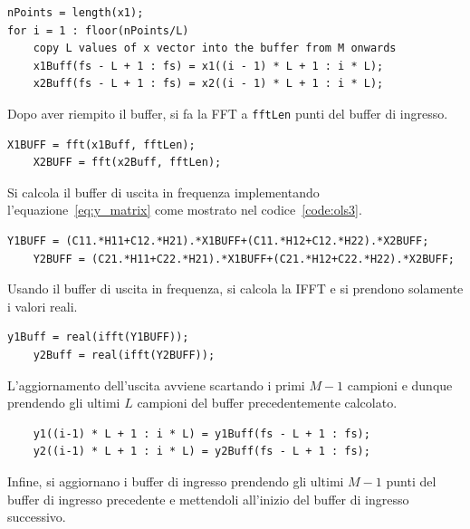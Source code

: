 \documentclass[12pt,a4paper,titlepage]{article}
\begin{document}
\begin{lstlisting}[label=code:ols1, caption=Copia di L campioni del segnale di ingresso nel buffer, captionpos=b]
nPoints = length(x1);
for i = 1 : floor(nPoints/L)
    copy L values of x vector into the buffer from M onwards
    x1Buff(fs - L + 1 : fs) = x1((i - 1) * L + 1 : i * L); 
    x2Buff(fs - L + 1 : fs) = x2((i - 1) * L + 1 : i * L); 
\end{lstlisting}

Dopo aver riempito il buffer, si fa la FFT a \texttt{fftLen} punti del buffer di ingresso.

\begin{lstlisting}[label=code:ols2, caption=FFT del buffer di ingresso, captionpos=b]
	X1BUFF = fft(x1Buff, fftLen);
	X2BUFF = fft(x2Buff, fftLen);
\end{lstlisting}

Si calcola il buffer di uscita in frequenza implementando l'equazione~\eqref{eq:y_matrix} come mostrato nel codice~\ref{code:ols3}.

\begin{lstlisting}[label=code:ols3, caption=Calcolo del buffer di uscita in frequenza, captionpos=b]
	Y1BUFF = (C11.*H11+C12.*H21).*X1BUFF+(C11.*H12+C12.*H22).*X2BUFF;
	Y2BUFF = (C21.*H11+C22.*H21).*X1BUFF+(C21.*H12+C22.*H22).*X2BUFF;
\end{lstlisting}
    
Usando il buffer di uscita in frequenza, si calcola la IFFT e si prendono solamente i valori reali.

\begin{lstlisting}[label=code:ols4, caption=IFFT del buffer di uscita, captionpos=b]
	y1Buff = real(ifft(Y1BUFF));
	y2Buff = real(ifft(Y2BUFF));
\end{lstlisting}  

L'aggiornamento dell'uscita avviene scartando i primi $M - 1$ campioni e dunque prendendo gli ultimi $L$ campioni del buffer precedentemente calcolato.

\begin{lstlisting}[label=code:ols5, caption=Aggiornamento dell'uscita, captionpos=b]
	% discard first M - 1 values
	y1((i-1) * L + 1 : i * L) = y1Buff(fs - L + 1 : fs); 
	y2((i-1) * L + 1 : i * L) = y2Buff(fs - L + 1 : fs); 
\end{lstlisting}  

Infine, si aggiornano i buffer di ingresso prendendo gli ultimi $M - 1$ punti del buffer di ingresso precedente e mettendoli all'inizio del buffer di ingresso successivo.
\end{document}
